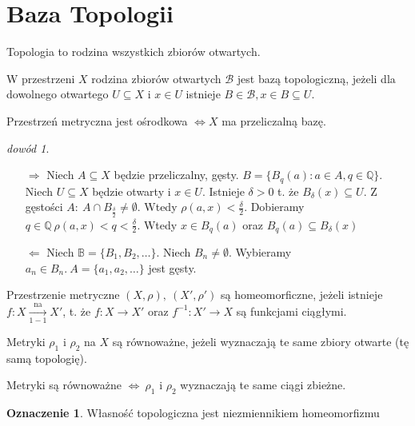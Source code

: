 \documentclass[twoside,10pt]{article}
\theoremstyle{definition}
\theoremstyle{definition}
\theoremstyle{definition}
\theoremstyle{definition}
\theoremstyle{remark}
\newtheorem*{dd}{dowód}
\theoremstyle{definition}
\theoremstyle{definition}
\theoremstyle{definition}
\newtheorem*{ozn}{Oznaczenie}
\theoremstyle{definition}
\theoremstyle{definition}
\theoremstyle{definition}
\begin{document}
\section{Baza Topologii} 
Topologia to rodzina wszystkich zbiorów otwartych. 
\begin{df} W przestrzeni $X$ rodzina zbiorów otwartych $\mathcal{B}$ jest bazą topologiczną, jeżeli dla dowolnego otwartego $U \subseteq X$ i $x \in U$ istnieje $B \in \mathcal{B}, x \in B \subseteq U$. \end{df}
\begin{tw} Przestrzeń metryczna jest ośrodkowa $\Leftrightarrow X$ ma przeliczalną bazę. \end{tw}
\begin{dd}\hfill 
    \begin{itemize} 
        \item[$\Rightarrow$] Niech $A \subseteq X$ będzie przeliczalny, gęsty. 
            $B = \{B_q(a): a \in A, q \in \mathbb{Q}\}$. Niech $U \subseteq X$ będzie otwarty i $x \in U$.
            Istnieje $\delta > 0$ t. że $B_\delta(x) \subseteq U$. 
            Z gęstości $A: \ A \cap B_{\frac{\delta}{2}} \neq \emptyset$. Wtedy 
            $\rho(a,x) < \frac{\delta}{2}$. Dobieramy $q \in \mathbb{Q} \ \rho(a,x) < q < \frac{\delta}{2}$. Wtedy 
            $x \in B_q(a)$ oraz $B_q(a) \subseteq B_\delta (x)$
        \item[$\Leftarrow$] Niech $\mathbb{B} = \{ B_1,B_2,\ldots\}$\footnotemark. Niech $B_n \neq \emptyset$. Wybieramy $a_n \in B_n.\ A = \{a_1,a_2,\ldots\}$ jest gęsty. 
    \end{itemize} 
\end{dd} 

\begin{df} Przestrzenie metryczne $(X,\rho), \ (X',\rho')$ są homeomorficzne, jeżeli istnieje $f: X \xrightarrow[1-1]{\text{na}} X'$, t. że
$f: X \rightarrow X'$ oraz $f^{-1}: X' \rightarrow X$ są funkcjami ciągłymi.\end{df}

\begin{df} Metryki $\rho_1$ i $\rho_2$ na $X$ są równoważne, jeżeli wyznaczają te same zbiory otwarte (tę samą topologię). \end{df} 
\begin{tw} Metryki są równoważne $\Leftrightarrow \ \rho_1$ i $\rho_2$ wyznaczają te same ciągi zbieżne. \end{tw}
\begin{ozn} Własność topologiczna jest niezmiennikiem homeomorfizmu \end{ozn}
\end{document}
